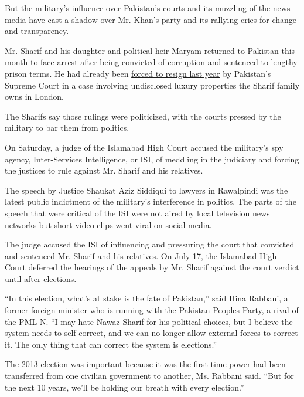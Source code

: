 But the military's influence over Pakistan's courts and its muzzling of
the news media have cast a shadow over Mr. Khan's party and its rallying
cries for change and transparency.

Mr. Sharif and his daughter and political heir Maryam
\href{https://www.nytimes.com/2018/07/13/world/asia/pakistan-sharif-arrrest.html}{returned
to Pakistan this month to face arrest} after being
\href{https://www.nytimes.com/2018/07/06/world/asia/pakistan-nawaz-sharif-corruption-verdict.html}{convicted
of corruption} and sentenced to lengthy prison terms. He had already
been
\href{https://www.nytimes.com/2017/07/28/world/asia/pakistan-prime-minister-nawaz-sharif-removed.html}{forced
to resign last year} by Pakistan's Supreme Court in a case involving
undisclosed luxury properties the Sharif family owns in London.

The Sharifs say those rulings were politicized, with the courts pressed
by the military to bar them from politics.

On Saturday, a judge of the Islamabad High Court accused the military's
spy agency, Inter-Services Intelligence, or ISI, of meddling in the
judiciary and forcing the justices to rule against Mr. Sharif and his
relatives.

The speech by Justice Shaukat Aziz Siddiqui to lawyers in Rawalpindi was
the latest public indictment of the military's interference in politics.
The parts of the speech that were critical of the ISI were not aired by
local television news networks but short video clips went viral on
social media.

The judge accused the ISI of influencing and pressuring the court that
convicted and sentenced Mr. Sharif and his relatives. On July 17, the
Islamabad High Court deferred the hearings of the appeals by Mr. Sharif
against the court verdict until after elections.

``In this election, what's at stake is the fate of Pakistan,'' said Hina
Rabbani, a former foreign minister who is running with the Pakistan
Peoples Party, a rival of the PML-N. ``I may hate Nawaz Sharif for his
political choices, but I believe the system needs to self-correct, and
we can no longer allow external forces to correct it. The only thing
that can correct the system is elections.''

The 2013 election was important because it was the first time power had
been transferred from one civilian government to another, Ms. Rabbani
said. ``But for the next 10 years, we'll be holding our breath with
every election.''

